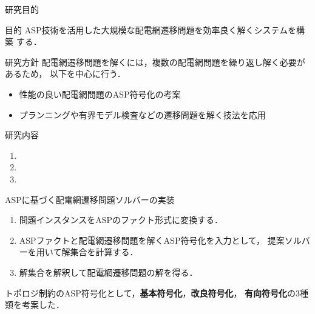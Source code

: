 \documentclass[dvipdfmx,11pt]{beamer}
\begin{document}
\begin{frame}{研究目的}
  \begin{alertblock}{目的}
   ASP技術を活用した大規模な配電網遷移問題を効率良く解くシステムを構築
   する．
  \end{alertblock}
  \vfill
\begin{exampleblock}{研究方針}
 配電網遷移問題を解くには，複数の配電網問題を繰り返し解く必要があるため，
 以下を中心に行う．
 \begin{itemize}
  \item 性能の良い配電網問題のASP符号化の考案
  \item プランニングや有界モデル検査などの遷移問題を解く技法を応用
 \end{itemize}

\end{exampleblock}
 \begin{block}{研究内容}
  \begin{enumerate}
   \item {}
   \item {}
   \item {}
  \end{enumerate}
 \end{block}
\end{frame}
\begin{frame}{ASPに基づく配電網遷移問題ソルバーの実装}
 \centering
 \scalebox{0.6}{\hspace{-1zw}}
 \vfill
 \begin{enumerate}
  \item 問題インスタンスをASPのファクト形式に変換する．
  \item ASPファクトと配電網遷移問題を解くASP符号化を入力として，
        提案ソルバーを用いて解集合を計算する．
  \item 解集合を解釈して配電網遷移問題の解を得る．
 \end{enumerate}\vfill
 \begin{alertblock}{}
  トポロジ制約のASP符号化として，\textbf{基本符号化}，\textbf{改良符号化}，
  \alert{\bf 有向符号化}の3種類を考案した．
 \end{alertblock}
\end{frame}
\end{document}
